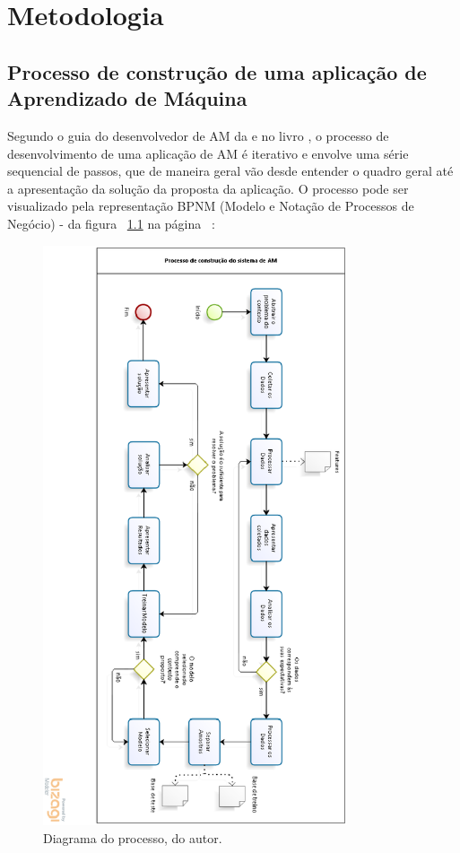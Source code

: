 \chapter{Metodologia}
\section{Processo de construção de uma aplicação de Aprendizado de Máquina}

Segundo o guia do desenvolvedor de AM da \cite{Amazon} e no livro \cite{geron2017hands}, o processo de desenvolvimento de uma aplicação de AM é iterativo e envolve uma série sequencial de passos, que de maneira geral vão desde entender o quadro geral até a apresentação da solução da proposta da aplicação. O processo pode ser visualizado pela representação BPNM (Modelo e Notação de Processos de Negócio) - da figura ~\ref{ProcessoAM} na página ~\pageref{ProcessoAM}:

\begin{figure}[!htb]
	\centering
	\includegraphics[width=0.8\textwidth]{figuras/ProcessoAM.eps}
	\caption{Diagrama do processo, do autor.}
	\label{ProcessoAM}
\end{figure}

